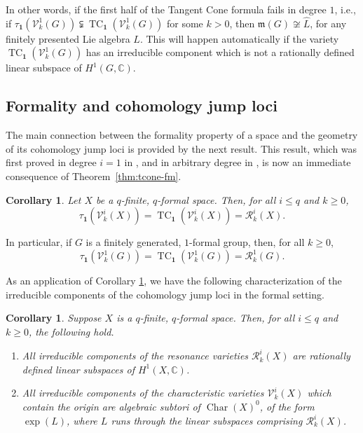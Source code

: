 \documentclass{article}
\numberwithin{equation}{section}
\newtheorem{corollary}[theorem]{Corollary}
\theoremstyle{definition}
\renewcommand{\C}{\mathbb{C}}
\newcommand{\VV}{\mathcal{V}}
\newcommand{\RR}{\mathcal{R}}
\newcommand{\m}{{\mathfrak{m}}}
\DeclareMathOperator{\TC}{TC}
\DeclareMathOperator{\Char}{Char}
\newcommand{\one}{\mathbf{1}}
\begin{document}
In other words, if the first half of the Tangent Cone formula fails in degree $1$, 
i.e., if $\tau_{\one}(\VV^1_k(G))\subsetneqq \TC_{\one}(\VV^1_k(G))$ for 
some $k> 0$, then $\m(G)\not\cong \widehat{L}$, for any finitely presented 
Lie algebra $L$.  This will happen automatically if the variety 
$\TC_{\one}(\VV^1_k(G))$ has an irreducible component which is not 
a rationally defined linear subspace of $H^1(G,\C)$.

\subsection{Formality and cohomology jump loci}
\label{subsec:formal-cjl}

The main connection between the formality property 
of a space and the geometry of its cohomology jump 
loci is provided by the next result. This result, which 
was first proved in degree $i=1$ in \cite{DPS-duke}, 
and in arbitrary degree in \cite{DP-ccm}, is now an 
immediate consequence of Theorem~\ref{thm:tcone-fm}.
 
\begin{corollary}
\label{cor:tcone}
Let $X$ be a $q$-finite, $q$-formal space. Then, for all $i\le q$ and 
$k\ge 0$,
\begin{equation}
\label{eq:tc}
\tau_{\one}(\VV^i_k(X))=\TC_{\one}(\VV^i_k(X))=\RR^i_k(X).
\end{equation}
\end{corollary}

In particular, if $G$ is a finitely generated, $1$-formal group, then, for all $k\ge 0$, 
\begin{equation}
\label{eq:tc-pi}
\tau_{\one}(\VV^1_k(G))= 
\TC_{\one}(\VV^1_k(G))=\RR^1_k(G).
\end{equation}

As an application of Corollary \ref{cor:tcone}, we have the following characterization 
of the irreducible components of the cohomology jump loci in the formal setting.

\begin{corollary}
\label{cor:rational}
Suppose $X$ is a $q$-finite, $q$-formal space.  Then, for 
all $i\le q$ and $k\ge 0$, the following hold.
\begin{enumerate}
\item \label{tc1}
All irreducible components of the resonance varieties  
$\RR^i_k(X)$ are rationally defined linear subspaces 
of $H^1(X,\C)$. 
\item \label{tc2}
All irreducible components of the characteristic varieties  
$\VV^i_k(X)$ which contain the origin are algebraic 
subtori of $\Char(X)^{0}$, of the form $\exp(L)$, where 
$L$ runs through the linear subspaces comprising $\RR^i_k(X)$.
\end{enumerate}
\end{corollary}
\end{document}
